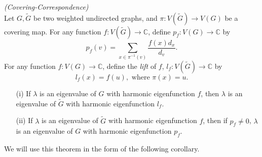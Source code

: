 \begin{theorem}\label{thm:cov-cor}
\emph{(Covering-Correspondence)} \\
Let $G, \tilde{G}$ be two weighted undirected graphs, and $\pi : V(\tilde{G}) \to V(G)$ be a covering map.  For any function $f : V(\tilde{G}) \to \mathbb{C}$, define $p_f : V(G) \to \mathbb{C}$ by
 \[ p_f(v) = \displaystyle \sum_{x \in \pi^{-1}(v)} \frac{f(x) d_x}{d_v} . \]
For any function $f : V(G) \to \mathbb{C}$, define the \textit{lift} of $f$, $l_f : V(\tilde{G}) \to \mathbb{C}$ by
 \[ l_f(x) = f(u), \text{ where $\pi(x) = u$}. \]
  
\begin{itemize}
 \item[(i)]  If $\lambda$ is an eigenvalue of $G$ with harmonic eigenfunction $f$, then $\lambda$ is an eigenvalue of $\tilde{G}$ with harmonic eigenfunction $l_f$.
 \item[(ii)] If $\lambda$ is an eigenvalue of $\tilde{G}$ with harmonic eigenfunction $f$, then if $p_f \neq 0$, $\lambda$ is an eigenvalue of $G$ with harmonic eigenfunction $p_f$.
\end{itemize}
\end{theorem}

We will use this theorem in the form of the following corollary.

